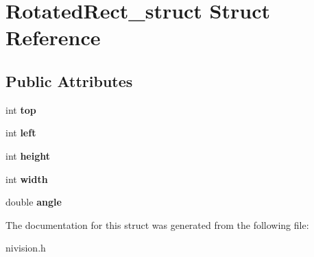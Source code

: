 \hypertarget{structRotatedRect__struct}{
\section{RotatedRect\_\-struct Struct Reference}
\label{structRotatedRect__struct}
}
\subsection*{Public Attributes}
\begin{DoxyCompactItemize}
\item 
\hypertarget{structRotatedRect__struct_a4f46f68321817b7ddda9cb4be08b8adc}{
int {\bfseries top}}
\label{structRotatedRect__struct_a4f46f68321817b7ddda9cb4be08b8adc}

\item 
\hypertarget{structRotatedRect__struct_afae18c17d6438f798c5c3d92709ebbf9}{
int {\bfseries left}}
\label{structRotatedRect__struct_afae18c17d6438f798c5c3d92709ebbf9}

\item 
\hypertarget{structRotatedRect__struct_a716ef359f909ac74d421d79f766136b2}{
int {\bfseries height}}
\label{structRotatedRect__struct_a716ef359f909ac74d421d79f766136b2}

\item 
\hypertarget{structRotatedRect__struct_a7cb9c79b581e847b02c3d25beaa2fd06}{
int {\bfseries width}}
\label{structRotatedRect__struct_a7cb9c79b581e847b02c3d25beaa2fd06}

\item 
\hypertarget{structRotatedRect__struct_ac0a34f120865456702b7f1dd10cddc9c}{
double {\bfseries angle}}
\label{structRotatedRect__struct_ac0a34f120865456702b7f1dd10cddc9c}

\end{DoxyCompactItemize}


The documentation for this struct was generated from the following file:\begin{DoxyCompactItemize}
\item 
nivision.h\end{DoxyCompactItemize}
